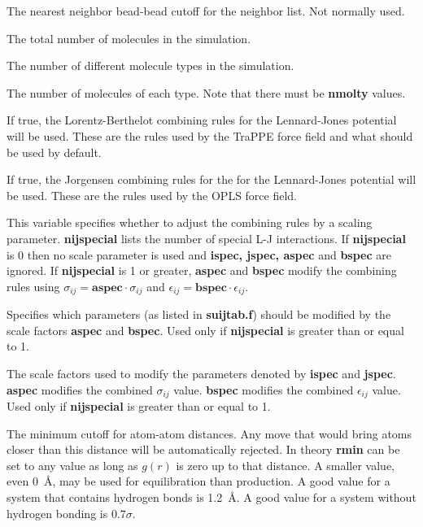 \documentclass[12pt,letterpaper]{article}
\begin{document}
 The nearest neighbor bead-bead cutoff for the neighbor
list.  Not normally used.

 The total number of molecules in the simulation.

 The number of different molecule types in the
simulation.

 The number of molecules of each type.  
Note that there must be \textbf{nmolty} values. 

 If true, the Lorentz-Berthelot combining rules
for the Lennard-Jones potential will be used.  These are the rules used by the 
TraPPE force field and what should be used by default.

 If true, the Jorgensen combining rules for the 
for the Lennard-Jones potential will be used.  These are the rules used by the
OPLS force field.

 This variable specifies whether to adjust the combining rules by a scaling parameter.
{\textbf{nijspecial}} lists the number of special L-J interactions.
If {\textbf{nijspecial}} is 0 then no scale parameter is used and {\textbf {ispec, jspec, aspec}} and {\textbf {bspec}} are ignored.
If {\textbf{nijspecial}} is 1 or greater, {\textbf{aspec}} and {\textbf{bspec}} modify the combining rules using $\sigma_{ij}={\textbf{aspec}}\cdot\sigma_{ij}$ and $\epsilon_{ij}={\textbf{bspec}}\cdot\epsilon_{ij}$.  

 Specifies which parameters (as listed in {\textbf {suijtab.f}}) 
should be modified by the scale factors {\textbf{aspec}} and {\textbf{bspec}}.
Used only if {\textbf{nijspecial}} is greater than or equal to 1.

 The scale factors used to modify the parameters denoted by {\textbf{ispec}} and {\textbf{jspec}}.
{\textbf{aspec}} modifies the combined $\sigma_{ij}$ value.
{\textbf{bspec}} modifies the combined $\epsilon_{ij}$ value.
Used only if {\textbf{nijspecial}} is greater than or equal to 1.

 The minimum cutoff for atom-atom distances.  Any move
that would bring atoms closer than this distance will be automatically rejected.  
In theory {\textbf{rmin}} can be set to any value as long as $g(r)$ is zero up to that distance.  
A smaller value, even 0~{\AA}, may be used for equilibration than production.
A good value for a system that contains hydrogen bonds is 1.2~{\AA}.
A good value for a system without hydrogen bonding is $0.7\sigma$.
\end{document}

